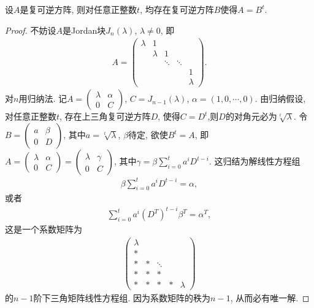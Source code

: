 \documentclass[../../main.tex]{subfiles}%
\begin{document}
\begin{proposition}\label{proposition:可逆复方阵必可开任意根}
设$A$是复可逆方阵, 则对任意正整数$t$, 均存在复可逆方阵$B$使得$A=B^t$.
\end{proposition}
\begin{proof}

不妨设$A$是Jordan块$J_n(\lambda)$, $\lambda\neq 0$, 即
\begin{align*}
A=\begin{pmatrix}
\lambda & 1 & & & \\
& \lambda & 1 & & \\
& & \ddots & \ddots & \\
& & & & 1 \\
& & & & \lambda
\end{pmatrix}.
\end{align*}
对$n$用归纳法. 记$A=\begin{pmatrix} \lambda & \alpha \\ 0 & C \end{pmatrix}$, $C=J_{n-1}(\lambda)$, $\alpha=(1,0,\cdots,0)$. 由归纳假设, 对任意正整数$t$, 存在上三角复可逆方阵$D$, 使得$C=D^t$,则$D$的对角元必为$\sqrt[t]{\lambda}$. 令$B=\begin{pmatrix} a & \beta \\ 0 & D \end{pmatrix}$, 其中$a=\sqrt[t]{\lambda}$, $\beta$待定, 欲使$B^t=A$, 即$A=\begin{pmatrix} \lambda & \alpha \\ 0 & C \end{pmatrix}=\begin{pmatrix} \lambda & \gamma \\ 0 & C \end{pmatrix}$, 其中$\gamma=\beta\sum\limits_{i=0}^{t}a^i D^{t-i}$. 这归结为解线性方程组
\begin{align*}
\beta\sum\limits_{i=0}^{t}a^i D^{t-i} = \alpha,
\end{align*}
或者
\begin{align*}
\sum\limits_{i=0}^{t}a^i (D^{T})^{t-i} \beta^{T} = \alpha^{T},
\end{align*}
 这是一个系数矩阵为
\begin{align*}
\begin{pmatrix}
\lambda & & & & \\
* & & & & \\
* & * & \ddots & & \\
* & * & * & & \\
* & * & * & * & \lambda
\end{pmatrix}
\end{align*}
的$n-1$阶下三角矩阵线性方程组. 因为系数矩阵的秩为$n-1$, 从而必有唯一解.

\end{proof}
\end{document}
